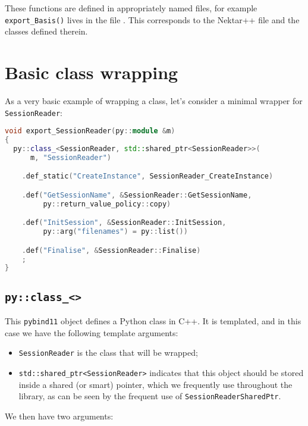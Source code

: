 These functions are defined in appropriately named files, for example
\texttt{export\_Basis()} lives in the file
. This corresponds to the
Nektar++ file  and the classes defined
therein.

\section{Basic class wrapping}

As a very basic example of wrapping a class, let's consider a minimal wrapper
for \texttt{SessionReader}:

\begin{lstlisting}[caption={Basic class wrapping with \texttt{pybind11}}, label={lst:basic_class_wrapping}, language=C++]
void export_SessionReader(py::module &m)
{
  py::class_<SessionReader, std::shared_ptr<SessionReader>>(
      m, "SessionReader")

    .def_static("CreateInstance", SessionReader_CreateInstance)

    .def("GetSessionName", &SessionReader::GetSessionName,
         py::return_value_policy::copy)

    .def("InitSession", &SessionReader::InitSession,
         py::arg("filenames") = py::list())

    .def("Finalise", &SessionReader::Finalise)
    ;
}
\end{lstlisting}

\subsection{\texttt{py::class\_<>}}

This \texttt{pybind11} object defines a Python class in C++. It is templated,
and in this case we have the following template arguments:

\begin{itemize}
  \item \texttt{SessionReader} is the class that will be wrapped;
  \item \texttt{std::shared\_ptr<SessionReader>} indicates that this object
  should be stored inside a shared (or smart) pointer, which we frequently use
  throughout the library, as can be seen by the frequent use of
  \texttt{SessionReaderSharedPtr}.
\end{itemize}

We then have two arguments:

